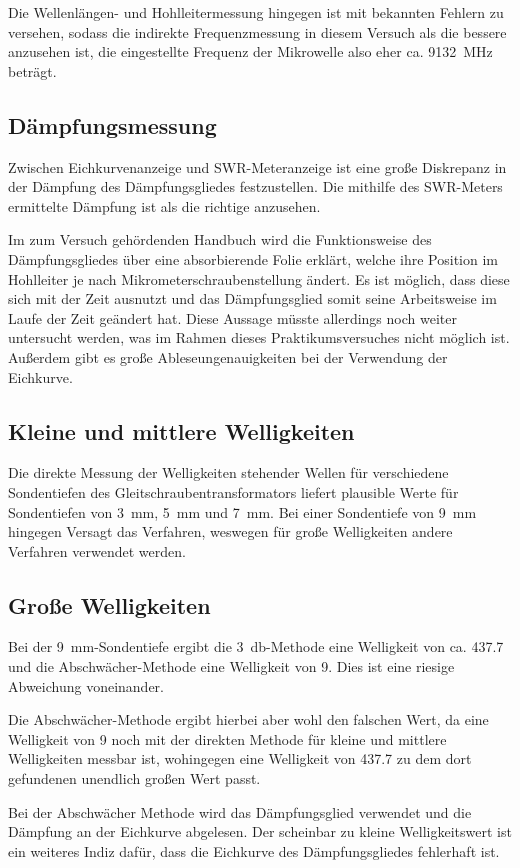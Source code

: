 Die Wellenlängen- und Hohlleitermessung hingegen ist mit 
bekannten Fehlern zu versehen, sodass die indirekte 
Frequenzmessung in diesem Versuch als die bessere anzusehen ist, 
die eingestellte Frequenz der Mikrowelle also eher 
ca. \SI{9132}{\mega\hertz} beträgt.
%
\subsection{Dämpfungsmessung}
%
Zwischen Eichkurvenanzeige und SWR-Meteranzeige ist eine 
große Diskrepanz in der Dämpfung des Dämpfungsgliedes 
festzustellen. 
Die mithilfe des SWR-Meters ermittelte Dämpfung ist als die 
richtige anzusehen. 

Im zum Versuch gehördenden Handbuch wird die 
Funktionsweise des Dämpfungsgliedes über eine absorbierende Folie 
erklärt, welche ihre Position im Hohlleiter je nach 
Mikrometerschraubenstellung ändert. Es ist möglich, dass diese sich 
mit der Zeit ausnutzt und das Dämpfungsglied somit seine Arbeitsweise 
im Laufe der Zeit geändert hat. Diese Aussage müsste allerdings noch 
weiter untersucht werden, was im Rahmen dieses Praktikumsversuches 
nicht möglich ist.
Außerdem gibt es große Ableseungenauigkeiten bei der Verwendung 
der Eichkurve.
%
\subsection{Kleine und mittlere Welligkeiten}
%
Die direkte Messung der Welligkeiten stehender Wellen für verschiedene 
Sondentiefen des Gleitschraubentransformators liefert plausible Werte 
für Sondentiefen von \SI{3}{\milli\metre}, \SI{5}{\milli\metre} und 
\SI{7}{\milli\metre}. Bei einer Sondentiefe von 
\SI{9}{\milli\metre} hingegen Versagt das Verfahren, weswegen 
für große Welligkeiten andere Verfahren verwendet werden.
%
\subsection{Große Welligkeiten}
%
Bei der \SI{9}{\milli\metre}-Sondentiefe ergibt 
die \SI{3}{\decibel}-Methode eine Welligkeit von ca. 
\SI{437.7}{} und die Abschwächer-Methode eine Welligkeit von 
\SI{9}{}. Dies ist eine riesige Abweichung voneinander. 

Die Abschwächer-Methode ergibt hierbei aber wohl den falschen Wert, 
da eine Welligkeit von \SI{9}{} noch mit der direkten Methode für 
kleine und mittlere Welligkeiten messbar ist, wohingegen 
eine Welligkeit von \SI{437.7}{} zu dem dort gefundenen unendlich 
großen Wert passt.

Bei der Abschwächer Methode wird das Dämpfungsglied verwendet und 
die Dämpfung an der Eichkurve abgelesen. Der scheinbar zu kleine 
Welligkeitswert ist ein weiteres Indiz dafür, dass die Eichkurve des 
Dämpfungsgliedes fehlerhaft ist.
%